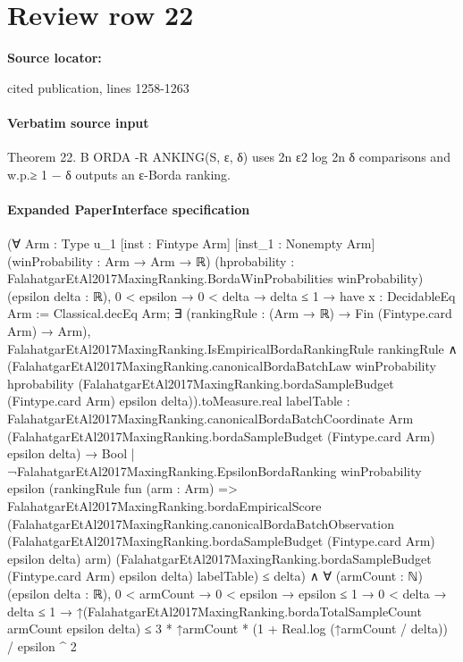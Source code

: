 \documentclass[10pt]{article}
\begin{document}
\section*{Review row 22}
\textbf{Source locator:} {\footnotesize\raggedright cited publication, lines 1258-\allowbreak{}1263\par}
\paragraph{Verbatim source input}
\begin{ReviewVerbatim}
Theorem 22. B ORDA -R ANKING(S, ε, δ) uses 2n
                                           ε2
                                              log 2n
                                                   δ
                                                     comparisons and w.p.≥ 1 − δ outputs an ε-Borda
ranking.
\end{ReviewVerbatim}



\paragraph{Expanded PaperInterface specification}
\begin{ReviewVerbatim}
(∀ {Arm : Type u_1} [inst : Fintype Arm] [inst_1 : Nonempty Arm] (winProbability : Arm → Arm → ℝ)
    (hprobability : FalahatgarEtAl2017MaxingRanking.BordaWinProbabilities winProbability) (epsilon delta : ℝ),
    0 < epsilon →
      0 < delta →
        delta ≤ 1 →
          have x : DecidableEq Arm := Classical.decEq Arm;
          ∃ (rankingRule : (Arm → ℝ) → Fin (Fintype.card Arm) → Arm),
            FalahatgarEtAl2017MaxingRanking.IsEmpiricalBordaRankingRule rankingRule ∧
              (FalahatgarEtAl2017MaxingRanking.canonicalBordaBatchLaw winProbability hprobability
                        (FalahatgarEtAl2017MaxingRanking.bordaSampleBudget (Fintype.card Arm) epsilon
                          delta)).toMeasure.real
                  {labelTable :
                    FalahatgarEtAl2017MaxingRanking.canonicalBordaBatchCoordinate Arm
                        (FalahatgarEtAl2017MaxingRanking.bordaSampleBudget (Fintype.card Arm) epsilon delta) →
                      Bool |
                    ¬FalahatgarEtAl2017MaxingRanking.EpsilonBordaRanking winProbability epsilon
                        (rankingRule fun (arm : Arm) =>
                          FalahatgarEtAl2017MaxingRanking.bordaEmpiricalScore
                            (FalahatgarEtAl2017MaxingRanking.canonicalBordaBatchObservation
                              (FalahatgarEtAl2017MaxingRanking.bordaSampleBudget (Fintype.card Arm) epsilon delta) arm)
                            (FalahatgarEtAl2017MaxingRanking.bordaSampleBudget (Fintype.card Arm) epsilon delta)
                            labelTable)} ≤
                delta) ∧
  ∀ (armCount : ℕ) (epsilon delta : ℝ),
    0 < armCount →
      0 < epsilon →
        epsilon ≤ 1 →
          0 < delta →
            delta ≤ 1 →
              ↑(FalahatgarEtAl2017MaxingRanking.bordaTotalSampleCount armCount epsilon delta) ≤
                3 * ↑armCount * (1 + Real.log (↑armCount / delta)) / epsilon ^ 2
\end{ReviewVerbatim}
\end{document}
